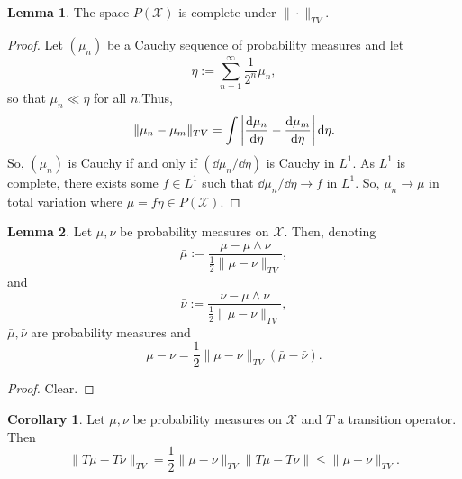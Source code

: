\documentclass[]{article}
\theoremstyle{definition}
\newtheorem{corollary}{Corollary}[theorem]
\theoremstyle{definition}
\newtheorem{lemma}{Lemma}[section]
\begin{document}
\begin{lemma}
  The space \(P(\mathcal{X})\) is complete under \(\|\cdot\|_{TV}\).
\end{lemma}
\begin{proof}
  Let \((\mu_n)\) be a Cauchy sequence of probability measures and let 
  \[\eta := \sum_{n = 1}^\infty \frac{1}{2^n} \mu_n,\]
  so that \(\mu_n \ll \eta\) for all \(n\).Thus, 
  \[\|\mu_n - \mu_m\|_{TV} = \int \left|\dv{\mu_n}{\eta} - \dv{\mu_m}{\eta}\right| \dd\eta.\]
  So, \((\mu_n)\) is Cauchy if and only if \((\dd \mu_n / \dd \eta)\) is Cauchy 
  in \(L^1\). As \(L^1\) is complete, there exists some \(f \in L^1\) such that 
  \(\dd \mu_n / \dd \eta \to f\) in \(L^1\). So, \(\mu_n \to \mu\) in total variation 
  where \(\mu = f \eta \in P(\mathcal{X})\).
\end{proof}

\begin{lemma}
  Let \(\mu, \nu\) be probability measures on \(\mathcal{X}\). Then, denoting 
  \[\bar \mu := \frac{\mu - \mu \wedge \nu}{\frac{1}{2}\|\mu - \nu\|_{TV}},\]
  and 
  \[\bar \nu := \frac{\nu - \mu \wedge \nu}{\frac{1}{2}\|\mu - \nu\|_{TV}},\]
  \(\bar \mu, \bar \nu\) are probability measures and 
  \[\mu - \nu = \frac{1}{2}\|\mu - \nu\|_{TV} (\bar \mu - \bar \nu).\]
\end{lemma}
\begin{proof}
  Clear.
\end{proof}

\begin{corollary}
  Let \(\mu, \nu\) be probability measures on \(\mathcal{X}\) and \(T\) a transition 
  operator. Then 
  \[\|T\mu - T\nu\|_{TV} = \frac{1}{2}\|\mu - \nu\|_{TV} \|T\bar \mu - T \bar \nu\| 
    \le \|\mu - \nu\|_{TV}.\]
\end{corollary}
\end{document}
